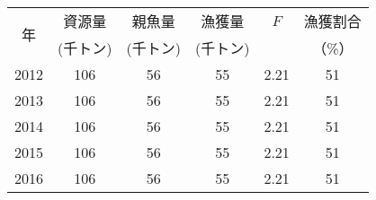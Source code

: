 \begin{center}
\begin{tabular}{cccccc}
\toprule
\multirow{2}{*}{年}	& {資源量} 	& {親魚量} 	& {漁獲量}	&	{$F$} & {漁獲割合}\tabularnewline
					& 	(千トン)	& (千トン)		&	(千トン)&		&	（\%）	\tabularnewline
\hline
2012 & 106 & 56 & 55 & 2.21 & 51 \tabularnewline
2013 & 106 & 56 & 55 & 2.21 & 51 \tabularnewline
2014 & 106 & 56 & 55 & 2.21 & 51 \tabularnewline
2015 & 106 & 56 & 55 & 2.21 & 51 \tabularnewline
2016 & 106 & 56 & 55 & 2.21 & 51 \tabularnewline
\bottomrule
\end{tabular}
\end{center}
